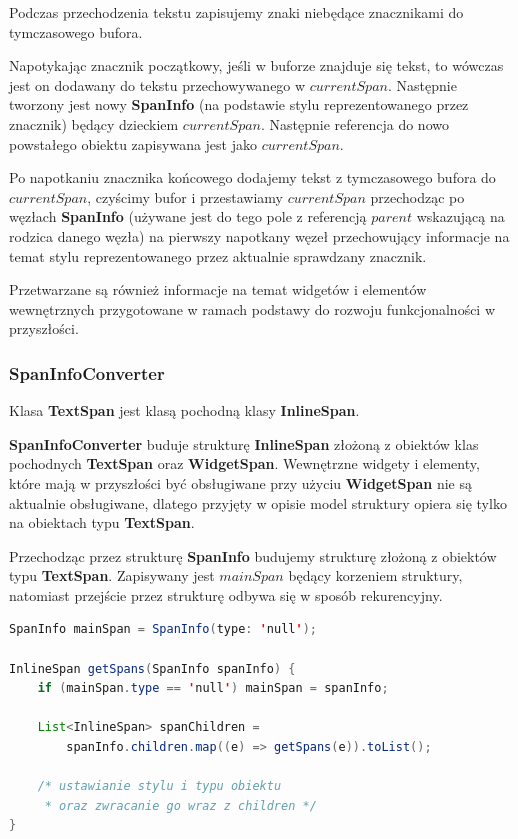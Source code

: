 Podczas przechodzenia tekstu zapisujemy znaki niebędące znacznikami do tymczasowego bufora.

Napotykając znacznik początkowy, jeśli w buforze znajduje się tekst, to wówczas jest on dodawany do tekstu przechowywanego w $currentSpan$. Następnie tworzony jest nowy \textbf{SpanInfo} (na podstawie stylu reprezentowanego przez znacznik) będący dzieckiem $currentSpan$. Następnie referencja do nowo powstałego obiektu zapisywana jest jako $currentSpan$. 

Po napotkaniu znacznika końcowego dodajemy tekst z tymczasowego bufora do $currentSpan$, czyścimy bufor i przestawiamy $currentSpan$ przechodząc po węzłach \textbf{SpanInfo} (używane jest do tego pole z referencją $parent$ wskazującą na rodzica danego węzła) na pierwszy napotkany węzeł przechowujący informacje na temat stylu reprezentowanego przez aktualnie sprawdzany znacznik.

Przetwarzane są również informacje na temat widgetów i elementów wewnętrznych przygotowane w ramach podstawy do rozwoju funkcjonalności w przyszłości.

\subsubsection{SpanInfoConverter}

Klasa \textbf{TextSpan} jest klasą pochodną klasy \textbf{InlineSpan}.

\textbf{SpanInfoConverter} buduje strukturę \textbf{InlineSpan} złożoną z obiektów klas pochodnych \textbf{TextSpan} oraz \textbf{WidgetSpan}. Wewnętrzne widgety i elementy, które mają w przyszłości być obsługiwane przy użyciu \textbf{WidgetSpan} nie są aktualnie obsługiwane, dlatego przyjęty w opisie model struktury opiera się tylko na obiektach typu \textbf{TextSpan}.

Przechodząc przez strukturę \textbf{SpanInfo} budujemy strukturę złożoną z obiektów typu \textbf{TextSpan}. Zapisywany jest $mainSpan$ będący korzeniem struktury, natomiast przejście przez strukturę odbywa się w sposób rekurencyjny.

\begin{lstlisting}[language=Java]
SpanInfo mainSpan = SpanInfo(type: 'null');

InlineSpan getSpans(SpanInfo spanInfo) {
    if (mainSpan.type == 'null') mainSpan = spanInfo;

    List<InlineSpan> spanChildren =
        spanInfo.children.map((e) => getSpans(e)).toList();

    /* ustawianie stylu i typu obiektu 
     * oraz zwracanie go wraz z children */
}
\end{lstlisting}
